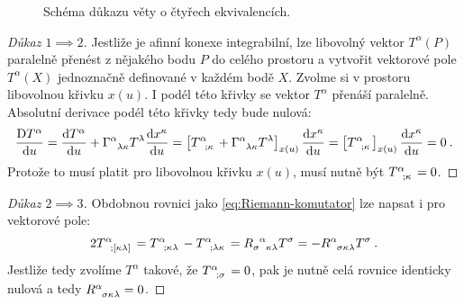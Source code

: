\documentclass{article}
\begin{document}
\begin{figure}[H] 

\centering
\def\svgwidth{2.6cm}

\caption{Schéma důkazu věty o čtyřech ekvivalencích.}
\label{fig:}

\end{figure}


\begin{proof}[Důkaz $1 \implies 2$]
    Jestliže je afinní konexe integrabilní, lze libovolný vektor $T^\alpha(P)$ paralelně přenést z nějakého bodu $P$ do celého prostoru a vytvořit vektorové pole $T^\alpha(X)$ jednoznačně definované v každém bodě $X$. Zvolme si v prostoru libovolnou křivku $x(u)$. I podél této křivky se vektor $T^\alpha$ přenáší paralelně. Absolutní derivace podél této křivky tedy bude nulová:
    \begin{align}
        \ader{T^\alpha}{u} = \der{T^\alpha}{u} + \Gamma\indices{^\alpha_\lambda_\kappa} T^\lambda \der{x^\kappa}{u} = \left[ T\indices{^\alpha_;_\kappa} + \Gamma\indices{^\alpha_\lambda_\kappa} T^\lambda \right]_{x(u)} \der{x^\kappa}{u} = \left[ T\indices{^\alpha_;_\kappa}\right]_{x(u)} \der{x^\kappa}{u} = 0 \:.
    \end{align} 
    Protože to musí platit pro libovolnou křivku $x(u)$, musí nutně být $T\indices{^\alpha_;_\kappa} = 0$.
\end{proof}

\begin{proof}[Důkaz $2 \implies 3$]
    Obdobnou rovnici jako \eqref{eq:Riemann-komutator} lze napsat i pro vektorové pole:
    \begin{align}
        2 T\indices{^\alpha_;_[_\kappa_\lambda_]} = T\indices{^\alpha_;_\kappa_\lambda} - T\indices{^\alpha_;_\lambda_\kappa} = R\indices{_\sigma^\alpha_\kappa_\lambda} T^\sigma = -R\indices{^\alpha_\sigma_\kappa_\lambda} T^\sigma \:.
    \end{align}
    Jestliže tedy zvolíme $T^\alpha$ takové, že $T\indices{^\alpha_;_\sigma} = 0$, pak je nutně celá rovnice identicky nulová a tedy $R\indices{^\alpha_\sigma_\kappa_\lambda} = 0$.
\end{proof}
\end{document}

